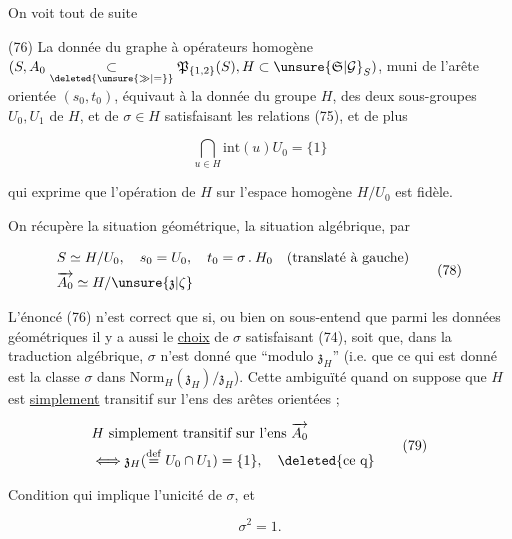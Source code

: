 
On voit tout de suite

(76) La donnée du graphe à opérateurs homogène $(S,A_0\underset{\deleted{\unsure{\gg|=}}}{\subset}\mathfrak P_{\{1,2\}}(S), H\subset\unsure{\mathfrak S|\mathcal G}_S)$, muni de l'arête orientée $(s_0,t_0)$, équivaut à la donnée du groupe $H$, des deux sous-groupes $U_0,U_1$ de $H$, et de $\sigma\in H$ satisfaisant les relations (75), et de plus

\[
\bigcap_{u\in H}\mathrm{int}(u)U_0=\{1\}
\tag*{(77)}
\]

qui exprime que l'opération de $H$ sur l'espace homogène $H/U_0$ est fidèle.

On récupère la situation géométrique,  la situation algébrique, par

\[
\begin{aligned}
&S\simeq H/U_0,\quad s_0=U_0,\quad t_0=\sigma\mathbin{.}H_0\quad\text{(translaté à gauche)}\\
&\overrightarrow{A_0}\simeq H/\unsure{\mathfrak z|\zeta}
\end{aligned}
\tag*{(78)}
\]

 L'énoncé (76) n'est correct que si, ou bien on sous-entend que parmi les données géométriques il y a aussi le \uline{choix} de $\sigma$ satisfaisant (74), soit que, dans la traduction algébrique, $\sigma$   n'est donné que \textquotedblleft{}modulo $\mathfrak z_H$\textquotedblright{} (i.e. que ce qui est donné est la classe   $\sigma$ dans $\mathrm{Norm}_H(\mathfrak z_H)/\mathfrak z_H$). Cette ambiguïté  quand on suppose que $H$ est \uline{simplement} transitif sur l'ens  des arêtes orientées ; 

\[
\begin{aligned}
&H\text{ simplement transitif sur l'ens }\overrightarrow{A_0}\\
&\Longleftrightarrow\mathfrak z_H(\overset{\mathrm{def}}{=}U_0\cap U_1)=\{1\},\quad\deleted{\text{ce q}}
\end{aligned}
\tag*{(79)}
\]

Condition qui implique l'unicité de $\sigma$, et

\[
\sigma^2=1 .
\tag*{(80)}
\]

